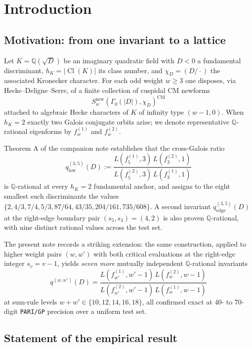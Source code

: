 \documentclass[11pt,a4paper]{amsart}
\theoremstyle{plain}
\theoremstyle{definition}
\DeclareMathOperator{\Cl}{Cl}
\newcommand{\Q}{\mathbb{Q}}
\newcommand{\eqdef}{:=}
\newcommand{\fl}[2]{f_{#1}^{(#2)}}
\newcommand{\qstr}[2]{q^{(#1,#2)}}
\newcommand{\absD}{\lvert D\rvert}
\begin{document}
\section{Introduction}\label{sec:intro}

\subsection{Motivation: from one invariant to a lattice}

Let $K = \Q(\sqrt{D})$ be an imaginary quadratic field with $D < 0$
a fundamental discriminant, $h_K = \lvert \Cl(K)\rvert$ its class number, and
$\chi_D = (D/\cdot)$ the associated Kronecker character. For
each odd weight $w \ge 3$ one disposes, via Hecke--Deligne--Serre, of a finite
collection of cuspidal CM newforms
\[
  S_w^{\mathrm{new}}(\Gamma_0(\absD),\chi_D)^{\mathrm{CM}}
\]
attached to algebraic Hecke characters of $K$ of infinity type $(w-1, 0)$.
When $h_K = 2$ exactly two Galois conjugate orbits arise; we denote
representative $\Q$-rational eigenforms by
$\fl{w}{1}$ and $\fl{w}{2}$.

Theorem A of the companion note \cite{Remondiere2026qD} establishes that the
cross-Galois ratio
\begin{equation}\label{eq:qold-intro}
  \qstr{3}{5}_{\mathrm{low}}(D)
   \eqdef \frac{L(\fl{5}{1},3)\,L(\fl{3}{2},1)}{L(\fl{5}{2},3)\,L(\fl{3}{1},1)}
\end{equation}
is $\Q$-rational at every $h_K = 2$ fundamental anchor, and assigns to the
eight smallest such discriminants the values
$\{2, 4/3, 7/4, 5/3, 87/64, 43/35, 204/161, 735/608\}$.
A second invariant
$\qstr{3}{5}_{\mathrm{edge}}(D)$ at the right-edge boundary pair
$(s_5, s_3) = (4, 2)$ is also proven $\Q$-rational, with nine distinct rational
values across the test set.

The present note records a striking extension: the same construction, applied
to higher weight pairs $(w, w')$ with both critical evaluations at the
right-edge integer $s_v = v-1$, yields \emph{seven more} mutually
independent $\Q$-rational invariants
\[
  \qstr{w}{w'}(D)
   = \frac{L(\fl{w'}{1}, w'-1)\,L(\fl{w}{2}, w-1)}
          {L(\fl{w'}{2}, w'-1)\,L(\fl{w}{1}, w-1)}
\]
at sum-rule levels $w+w' \in \{10, 12, 14, 16, 18\}$, all confirmed exact at
$40$- to $70$-digit \texttt{PARI/GP} precision over a uniform test set.

\subsection{Statement of the empirical result}
\end{document}
